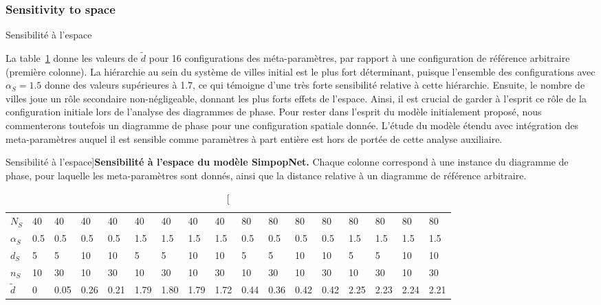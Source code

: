 \subsubsection{Sensitivity to space}{Sensibilité à l'espace}

La table~\ref{tab:macrocoevolexplo:spacematters} donne les valeurs de $\tilde{d}$ pour 16 configurations des méta-paramètres, par rapport à une configuration de référence arbitraire (première colonne). La hiérarchie au sein du système de villes initial est le plus fort déterminant, puisque l'ensemble des configurations avec $\alpha_S = 1.5$ donne des valeurs supérieures à 1.7, ce qui témoigne d'une très forte sensibilité relative à cette hiérarchie. Ensuite, le nombre de villes joue un rôle secondaire non-négligeable, donnant les plus forts effets de l'espace. Ainsi, il est crucial de garder à l'esprit ce rôle de la configuration initiale lors de l'analyse des diagrammes de phase. Pour rester dans l'esprit du modèle initialement proposé, nous commenterons toutefois un diagramme de phase pour une configuration spatiale donnée. L'étude du modèle étendu avec intégration des meta-paramètres auquel il est sensible comme paramètres à part entière est hors de portée de cette analyse auxiliaire.


\begin{table}[!ht]
\caption[Sensibility to space][Sensibilité à l'espace]{}{\textbf{Sensibilité à l'espace du modèle SimpopNet.} Chaque colonne correspond à une instance du diagramme de phase, pour laquelle les meta-paramètres sont donnés, ainsi que la distance relative à un diagramme de référence arbitraire.\label{tab:macrocoevolexplo:spacematters}}
\begin{tabular}{|l|l|l|l|l|l|l|l|l|l|l|l|l|l|l|l|l|}
\hline
$N_S$ & 40 & 40 & 40 & 40 & 40 & 40 & 40 & 40 & 80 & 80 & 80 & 80 & 80 & 80 & 80 & 80\\
$\alpha_S$ & 0.5 & 0.5 & 0.5 & 0.5 & 1.5 & 1.5 & 1.5 & 1.5 & 0.5 & 0.5 & 0.5 & 0.5 & 1.5 & 1.5 & 1.5 & 1.5\\
$d_S$ & 5 & 5 & 10 & 10 & 5 & 5 & 10 & 10 & 5 & 5 & 10 & 10 & 5 & 5 & 10 & 10\\
$n_S$ & 10 & 30 & 10 & 30 & 10 & 30 & 10 & 30 & 10 & 30 & 10 & 30 & 10 & 30 & 10 & 30\\
$\tilde{d}$ & 0 & 0.05 & 0.26 & 0.21 & 1.79 & 1.80 & 1.79 & 1.72 & 0.44 & 0.36 & 0.42 & 0.42 & 2.25 & 2.23 & 2.24 & 2.21\\\hline
\end{tabular}
\end{table}



